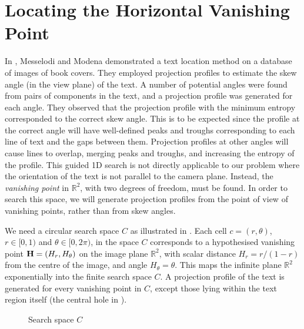 \section{Locating the Horizontal Vanishing Point}  \label{locatehvpsect}

In \cite{messelod1}, Messelodi and Modena demonstrated a text location method on
a database of images of book covers.  They employed projection profiles to
estimate the skew angle (in the view plane) of the text.  A number of potential
angles were found from pairs of components in the text, and a projection profile
was generated for each angle.  They observed that the projection profile with
the minimum entropy corresponded to the correct skew angle.  This is to be
expected since the profile at the correct angle will have well-defined peaks and
troughs corresponding to each line of text and the gaps between them.
Projection profiles at other angles will cause lines to overlap, merging peaks
and troughs, and increasing the entropy of the profile.  This guided 1D search
is not directly applicable to our problem where the orientation of the text is
not parallel to the camera plane. Instead, the {\em vanishing point} in
$\mathbb{R}^2$, with two degrees of freedom, must be found. In order to search
this space, we will generate projection profiles from the point of view of
vanishing points, rather than from skew angles.



We need a circular search space $C$ as illustrated in .
Each cell $c=(r,\theta)$, $r\in[0,1)$ and $\theta\in[0,2\pi)$, in the space $C$
corresponds to a hypothesised vanishing point ${ \bf H } = (H_r,H_{\theta})$ on
the image plane $\mathbb{R}^2$, with scalar distance $H_{r}=r/{(1-r)}$ from the
centre of the image, and angle $H_{\theta}=\theta$.  This maps the infinite
plane $\mathbb{R}^2$ exponentially into the finite search space $C$.
A projection profile of the text is generated for
every vanishing point in $C$, except those lying within
the text region itself (the central hole in ).


\begin{figure}[ht!]
\centering
\begin{center}
	\hspace{5mm}
\end{center}
\vspace*{0mm}
\caption{Search space $C$}
\label{searchspace}
\end{figure}

